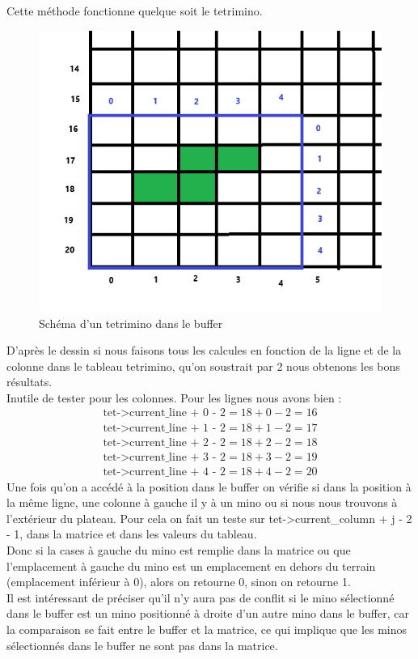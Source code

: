 \documentclass[a4paper,10p]{report}
\begin{document}
Cette méthode fonctionne quelque soit le tetrimino.
\begin{figure}[ht]
\includegraphics[scale=0.5]{dessin5.png}
\caption{\label{dessin4} Schéma d'un tetrimino dans le buffer}
\end{figure}
D'après le dessin si nous faisons tous les calcules en fonction de la ligne et de la colonne dans le tableau tetrimino, qu'on soustrait par 2 nous obtenons les bons résultats.
\\Inutile de tester pour les colonnes.
Pour les lignes nous avons bien :
\begin{equation*}
    \begin{split}
        \text{tet->current\_line + 0 - 2}=18+0-2=16
        \\
        \text{tet->current\_line + 1 - 2}=18+1-2=17
        \\
        \text{tet->current\_line + 2 - 2}=18+2-2=18
        \\
        \text{tet->current\_line + 3 - 2}=18+3-2=19
        \\
        \text{tet->current\_line + 4 - 2}=18+4-2=20
    \end{split}
\end{equation*}
Une fois qu'on a accédé à la position dans le buffer on vérifie si dans la position à la même ligne, une colonne à gauche il y à un mino ou si nous nous trouvons à l'extérieur du plateau. Pour cela on fait un teste sur tet->current\_column + j - 2 - 1, dans la matrice et dans les valeurs du tableau.
\\Donc si la cases à gauche du mino est remplie dans la matrice ou que l'emplacement à gauche du mino est un emplacement en dehors du terrain (emplacement inférieur à 0), alors on retourne 0, sinon on retourne 1.
\\Il est intéressant de préciser qu'il n'y aura pas de conflit si le mino sélectionné dans le buffer est un mino positionné à droite d'un autre mino dans le buffer, car la comparaison se fait entre le buffer et la matrice, ce qui implique que les minos sélectionnés dans le buffer ne sont pas dans la matrice.
\end{document}
